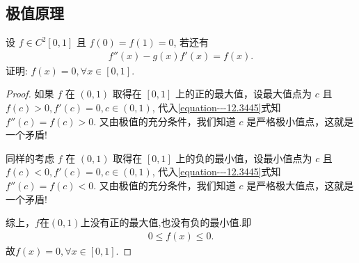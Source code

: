 \documentclass[../../main.tex]{subfiles}%
\begin{document}
\subsection{极值原理}

\begin{example}
设 $f\in C^2[0,1]$ 且 $f(0)=f(1)=0$, 若还有
\begin{align}
f''(x)-g(x)f'(x)=f(x).
\label{equation---12.3445}
\end{align}
证明:
$f(x)=0,\forall x\in[0,1]$.
\end{example}
\begin{proof}
如果 $f$ 在 $(0,1)$ 取得在 $[0,1]$ 上的正的最大值，设最大值点为 $c$ 且 $f(c)>0,f'(c)=0,c\in(0,1)$, 代入\eqref{equation---12.3445}式知 $f''(c)=f(c)>0$. 又由极值的充分条件，我们知道 $c$ 是严格极小值点，这就是一个矛盾!

同样的考虑 $f$ 在 $(0,1)$ 取得在 $[0,1]$ 上的负的最小值，设最小值点为 $c$ 且 $f(c)<0,f'(c)=0,c\in(0,1)$, 代入\eqref{equation---12.3445}式知 $f''(c)=f(c)<0$. 又由极值的充分条件，我们知道 $c$ 是严格极大值点，这就是一个矛盾!

综上，$f$在$(0,1)$上没有正的最大值,也没有负的最小值.即
\begin{align*}
0\leqslant f(x)\leqslant0.
\end{align*}
故$f(x)=0,\forall x\in[0,1]$. 
\end{proof}
\end{document}
